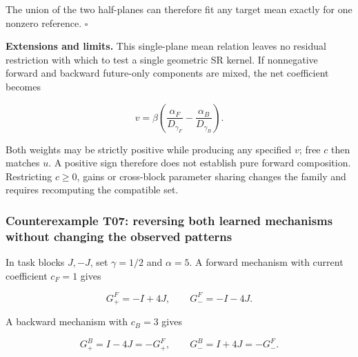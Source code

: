 \documentclass[11pt,a4paper]{article}
\begin{document}
The union of the two half-planes can therefore fit any target mean
exactly for one nonzero reference. \(\square\)

\par
\noindent\begin{minipage}{\linewidth}

\textbf{Extensions and limits.} This single-plane mean relation leaves
no residual restriction with which to test a single geometric SR kernel.
If nonnegative forward and backward future-only components are mixed,
the net coefficient becomes

\[
v=\beta\left(\frac{\alpha_F}{D_{\gamma_F}}
-\frac{\alpha_B}{D_{\gamma_B}}\right).
\]

\end{minipage}\par

Both weights may be strictly positive while producing any specified
\(v\); free \(c\) then matches \(u\). A positive sign therefore does not
establish pure forward composition. Restricting \(c\ge0\), gains or
cross-block parameter sharing changes the family and requires
recomputing the compatible set.

\subsubsection{Counterexample T07: reversing both learned mechanisms
without changing the observed
patterns}\label{counterexample-t07-reversing-both-learned-mechanisms-without-changing-the-observed-patterns}

\par
\noindent\begin{minipage}{\linewidth}

In task blocks \(J,-J\), set \(\gamma=1/2\) and \(\alpha=5\). A forward
mechanism with current coefficient \(c_F=1\) gives

\[
G^F_+=-I+4J,\qquad G^F_-=-I-4J.
\]

\end{minipage}\par

\par
\noindent\begin{minipage}{\linewidth}

A backward mechanism with \(c_B=3\) gives

\[
G^B_+=I-4J=-G^F_+,\qquad
G^B_-=I+4J=-G^F_-.
\]

\end{minipage}\par
\end{document}
